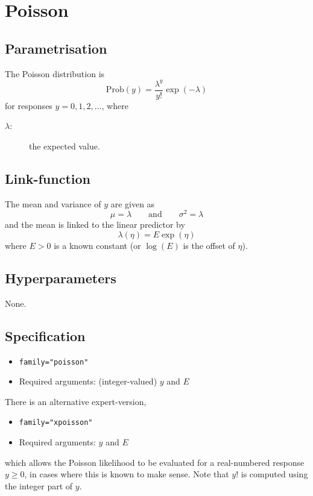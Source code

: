 \documentclass[a4paper,11pt]{article}
\begin{document}
\section*{Poisson}

\subsection*{Parametrisation}

The Poisson distribution is
\begin{displaymath}
    \text{Prob}(y) = \frac{\lambda^{y}}{y!}\exp(-\lambda)
\end{displaymath}
for responses $y=0, 1, 2, \ldots$, where
\begin{description}
\item[$\lambda$:] the expected value.
\end{description}

\subsection*{Link-function}

The mean and variance of $y$ are given as
\begin{displaymath}
    \mu = \lambda \qquad\text{and}\qquad \sigma^{2} = \lambda
\end{displaymath}
and the mean is linked to the linear predictor by
\begin{displaymath}
    \lambda(\eta) = E \exp(\eta)
\end{displaymath}
where $E>0$ is a known constant (or $\log(E)$ is the offset of $\eta$).

\subsection*{Hyperparameters}

None.

\subsection*{Specification}

\begin{itemize}
\item \texttt{family="poisson"}
\item Required arguments: (integer-valued) $y$ and $E$
\end{itemize}

\noindent There is an alternative expert-version,
\begin{itemize}
\item \texttt{family="xpoisson"}
\item Required arguments: $y$ and $E$
\end{itemize}
which allows the Poisson likelihood to be evaluated for a
real-numbered response $y\ge0$, in cases where this is known to make
sense. Note that $y!$ is computed using the integer part of $y$.
\end{document}
